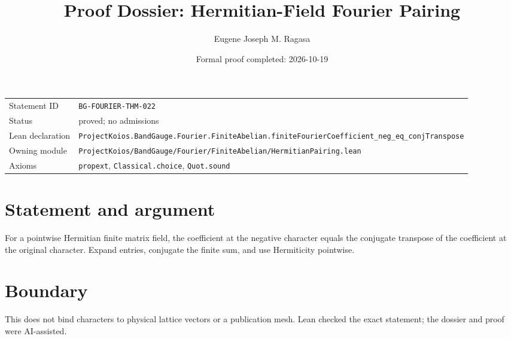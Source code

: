 \documentclass[11pt]{article}
\title{Proof Dossier: Hermitian-Field Fourier Pairing}
\author{Eugene Joseph M. Ragasa}
\date{Formal proof completed: 2026-10-19}
\begin{document}
\maketitle
\noindent\begin{tabularx}{\textwidth}{@{}lX@{}}\toprule
Statement ID & \texttt{BG-FOURIER-THM-022} \\
Status & proved; no admissions \\
Lean declaration & \texttt{ProjectKoios.BandGauge.Fourier.FiniteAbelian.}\newline\texttt{finiteFourierCoefficient\_neg\_eq\_conjTranspose} \\
Owning module & \texttt{ProjectKoios/BandGauge/Fourier/FiniteAbelian/HermitianPairing.lean} \\
Axioms & \texttt{propext}, \texttt{Classical.choice}, \texttt{Quot.sound} \\
\bottomrule\end{tabularx}
\section{Statement and argument}
For a pointwise Hermitian finite matrix field, the coefficient at the negative character equals the conjugate transpose of the coefficient at the original character. Expand entries, conjugate the finite sum, and use Hermiticity pointwise.
\section{Boundary}
This does not bind characters to physical lattice vectors or a publication mesh. Lean checked the exact statement; the dossier and proof were AI-assisted.
\end{document}
